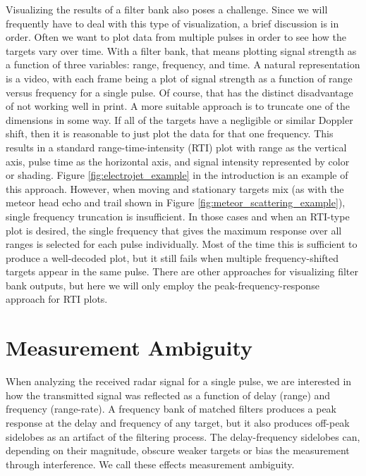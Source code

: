 Visualizing the results of a filter bank also poses a challenge. Since we will frequently have to deal with this type of visualization, a brief discussion is in order. Often we want to plot data from multiple pulses in order to see how the targets vary over time. With a filter bank, that means plotting signal strength as a function of three variables: range, frequency, and time. A natural representation is a video, with each frame being a plot of signal strength as a function of range versus frequency for a single pulse. Of course, that has the distinct disadvantage of not working well in print. A more suitable approach is to truncate one of the dimensions in some way. If all of the targets have a negligible or similar Doppler shift, then it is reasonable to just plot the data for that one frequency. This results in a standard range-time-intensity (RTI) plot with range as the vertical axis, pulse time as the horizontal axis, and signal intensity represented by color or shading. Figure \ref{fig:electrojet_example} in the introduction is an example of this approach. However, when moving and stationary targets mix (as with the meteor head echo and trail shown in Figure \ref{fig:meteor_scattering_example}), single frequency truncation is insufficient. In those cases and when an RTI-type plot is desired, the single frequency that gives the maximum response over all ranges is selected for each pulse individually. Most of the time this is sufficient to produce a well-decoded plot, but it still fails when multiple frequency-shifted targets appear in the same pulse. There are other approaches for visualizing filter bank outputs, but here we will only employ the peak-frequency-response approach for RTI plots.

\section{Measurement Ambiguity}
\label{radar_ambiguity}
When analyzing the received radar signal for a single pulse, we are interested in how the transmitted signal was reflected as a function of delay (range) and frequency (range-rate). A frequency bank of matched filters produces a peak response at the delay and frequency of any target, but it also produces off-peak sidelobes as an artifact of the filtering process. The delay-frequency sidelobes can, depending on their magnitude, obscure weaker targets or bias the measurement through interference. We call these effects measurement ambiguity.

